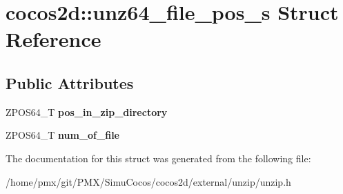 \hypertarget{structcocos2d_1_1unz64__file__pos__s}{}\section{cocos2d\+:\+:unz64\+\_\+file\+\_\+pos\+\_\+s Struct Reference}
\label{structcocos2d_1_1unz64__file__pos__s}
\subsection*{Public Attributes}
\begin{DoxyCompactItemize}
\item 
\mbox{\label{structcocos2d_1_1unz64__file__pos__s_a6ed084d49548cf5eca544617b587abf5}} 
Z\+P\+O\+S64\+\_\+T {\bfseries pos\+\_\+in\+\_\+zip\+\_\+directory}
\item 
\mbox{\label{structcocos2d_1_1unz64__file__pos__s_a6bee1f3e1b4d1d9ea98cf84d23f9cd9f}} 
Z\+P\+O\+S64\+\_\+T {\bfseries num\+\_\+of\+\_\+file}
\end{DoxyCompactItemize}


The documentation for this struct was generated from the following file\+:\begin{DoxyCompactItemize}
\item 
/home/pmx/git/\+P\+M\+X/\+Simu\+Cocos/cocos2d/external/unzip/unzip.\+h\end{DoxyCompactItemize}
